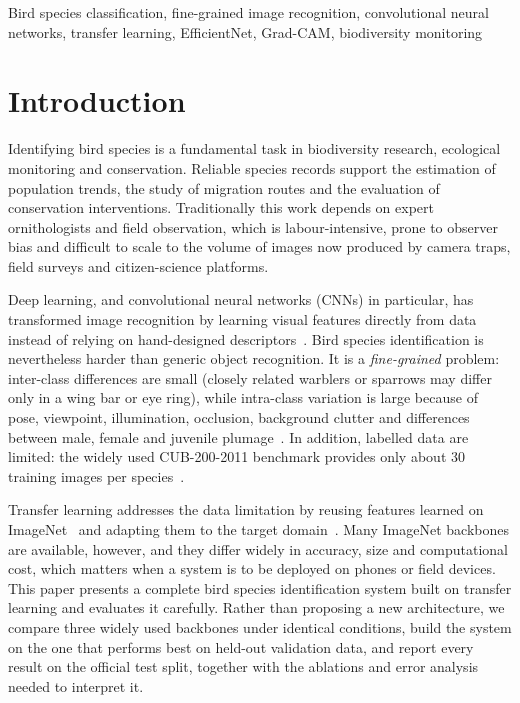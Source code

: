 \documentclass[conference]{IEEEtran}
\begin{document}
\begin{IEEEkeywords}
Bird species classification, fine-grained image recognition, convolutional
neural networks, transfer learning, EfficientNet, Grad-CAM, biodiversity monitoring
\end{IEEEkeywords}

\section{Introduction}
Identifying bird species is a fundamental task in biodiversity research,
ecological monitoring and conservation. Reliable species records support the
estimation of population trends, the study of migration routes and the
evaluation of conservation interventions. Traditionally this work depends on
expert ornithologists and field observation, which is labour-intensive, prone to
observer bias and difficult to scale to the volume of images now produced by
camera traps, field surveys and citizen-science platforms.

Deep learning, and convolutional neural networks (CNNs) in particular, has
transformed image recognition by learning visual features directly from data
instead of relying on hand-designed descriptors~\cite{krizhevsky2012,simonyan2015}.
Bird species identification is nevertheless harder than generic object
recognition. It is a \emph{fine-grained} problem: inter-class differences are
small (closely related warblers or sparrows may differ only in a wing bar or
eye ring), while intra-class variation is large because of pose, viewpoint,
illumination, occlusion, background clutter and differences between male,
female and juvenile plumage~\cite{wah2011}. In addition, labelled data are
limited: the widely used CUB-200-2011 benchmark provides only about 30 training
images per species~\cite{wah2011}.

Transfer learning addresses the data limitation by reusing features learned on
ImageNet~\cite{deng2009} and adapting them to the target domain~\cite{yosinski2014}.
Many ImageNet backbones are available, however, and they differ widely in
accuracy, size and computational cost, which matters when a system is to be
deployed on phones or field devices. This paper presents a complete bird species
identification system built on transfer learning and evaluates it carefully.
Rather than proposing a new architecture, we compare three widely used backbones
under identical conditions, build the system on the one that performs best on
held-out validation data, and report every result on the official test split,
together with the ablations and error analysis needed to interpret it.
\end{document}
